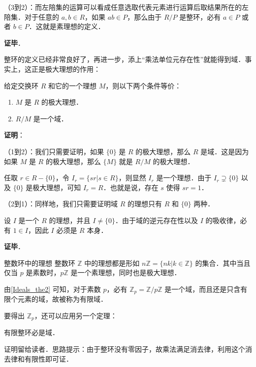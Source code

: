 （3到2）：而左陪集的运算可以看成任意选取代表元素进行运算后取结果所在的左陪集．对于任意的 $a, b\in R$，如果 $ab\in P$，那么由于 $R/P$ 是整环，必有 $a\in P$ 或者 $b\in P$．这就是素理想的定义．

\textbf{证毕}．

整环的定义已经非常良好了，再进一步，添上“乘法单位元存在性”就能得到域．事实上，这正是极大理想的作用：

\begin{theorem}{}\label{Ideals_the2}
给定交换环 $R$ 和它的一个理想 $M$，则以下两个条件等价：
\begin{enumerate}
\item $M$ 是 $R$ 的极大理想．
\item $R/M$ 是一个域．
\end{enumerate}
\end{theorem}

\textbf{证明}：




（1到2）：我们只需要证明，如果 $\{0\}$ 是 $R$ 的极大理想，那么 $R$ 是域．这是因为如果 $M$ 是 $R$ 的极大理想，那么 $\{M\}$ 就是 $R/M$ 的极大理想．

任取 $r\in R-\{0\}$，令 $I_r=\{sr|s\in R\}$，则显然 $I_r$ 是一个理想．由于 $I_r\supsetneq \{0\}$ 以及 $\{0\}$ 是极大理想，可知 $I_r=R$．也就是说，存在 $s$ 使得 $sr=1$．

（2到1）：同样地，我们只需要证明域 $R$ 的理想只有 $R$ 和 $\{0\}$ 两种．

设 $I$ 是一个 $R$ 的理想，并且 $I\not=\{0\}$．由于域的逆元存在性以及 $I$ 的吸收律，必有 $1\in I$，因此 $I$ 必须是 $R$ 本身．


\textbf{证毕}．


\begin{example}{整数环中的理想}
整数环 $\mathbb{Z}$ 中的理想都是形如 $n\mathbb{Z}=\{nk|k\in\mathbb{Z}\}$ 的集合．其中当且仅当 $p$ 是素数时，$p\mathbb{Z}$ 是一个素理想，同时也是极大理想．

由\autoref{Ideals_the2} 可知，对于素数 $p$，必有 $\mathbb{Z}_p=\mathbb{Z}/p\mathbb{Z}$ 是一个域，而且还是只含有限个元素的域，故被称为有限域．
\end{example}

要得出 $\mathbb{Z}_p$，还可以应用另一个定理：

\begin{theorem}{}
有限整环必是域．
\end{theorem}

证明留给读者．思路提示：由于整环没有零因子，故乘法满足消去律，利用这个消去律和有限性即可证．




